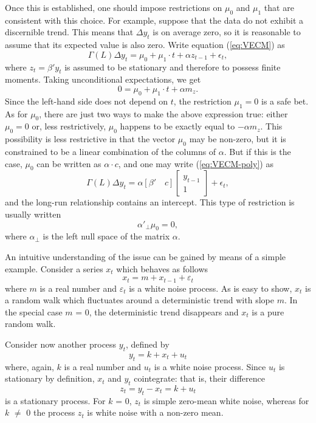 Once this is established, one should impose restrictions on $\mu_0$
and $\mu_1$ that are consistent with this choice. For example, suppose
that the data do not exhibit a discernible trend. This means
that $\Delta y_t$ is on average zero, so it is reasonable to assume
that its expected value is also zero. Write equation (\ref{eq:VECM})
as
\begin{equation}
  \label{eq:VECM-poly}
  \Gamma(L) \Delta y_t = \mu_0 + \mu_1 \cdot t + \alpha z_{t-1} +
  \epsilon_t ,
\end{equation}
where $z_{t} = \beta' y_{t}$ is assumed to be stationary and therefore
to possess finite moments. Taking unconditional expectations, we get
\[ 
  0 = \mu_0 + \mu_1 \cdot t + \alpha m_z .
\]
Since the left-hand side does not depend on $t$, the restriction
$\mu_1 = 0$ is a safe bet. As for $\mu_0$, there are just two ways to
make the above expression true: either $\mu_0 = 0$ or, less
restrictively, $\mu_0$ happens to be exactly equal to $-\alpha m_z$.
This possibility is less restrictive in that the vector $\mu_0$ may be
non-zero, but it is constrained to be a linear combination of the
columns of $\alpha$. But if this is the case, $\mu_0$ can be written
as $\alpha \cdot c$, and one may write (\ref{eq:VECM-poly}) as
\[
  \Gamma(L) \Delta y_t = \alpha \left[ \beta' \quad c \right] 
  \left[ \begin{array}{c} y_{t-1} \\ 1 \end{array} \right]  
  + \epsilon_t ,
\]
and the long-run relationship contains an intercept. This type of
restriction is usually written
\[
  \alpha'_{\perp} \mu_0 = 0 ,
\]
where $\alpha_{\perp}$ is the left null space of the matrix $\alpha$.

An intuitive understanding of the issue can be gained by means of a
simple example. Consider a series $x_t$ which behaves as follows
%      
\[ x_t = m + x_{t-1} + \varepsilon_t \] 
%
where $m$ is a real number and $\varepsilon_t$ is a white noise
process. As is easy to show, $x_t$ is a random walk which fluctuates
around a deterministic trend with slope $m$. In the special case $m$ =
0, the deterministic trend disappears and $x_t$ is a pure random walk.
    
Consider now another process $y_t$, defined by
%      
\[ y_t = k + x_t + u_t \] 
%
where, again, $k$ is a real number and $u_t$ is a white noise process.
Since $u_t$ is stationary by definition, $x_t$ and $y_t$ cointegrate:
that is, their difference
%      
\[ z_t = y_t - x_t = k + u_t \]
%	
is a stationary process. For $k$ = 0, $z_t$ is simple zero-mean white
noise, whereas for $k$ $\ne$ 0 the process $z_t$ is white noise with a
non-zero mean.
  
